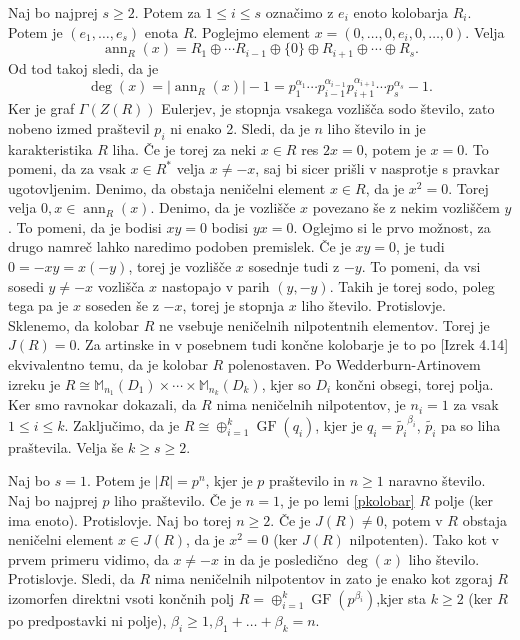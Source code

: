 \documentclass[a4paper, 12pt]{amsart}
\theoremstyle{definition} %
\theoremstyle{plain} %
\newcommand{\M}{\mathbb M}
\DeclareMathOperator{\ann}{ann}
\DeclareMathOperator{\GF}{GF}
\begin{document}
Naj bo najprej $s\ge 2$. Potem za $1 \le i \le s$ označimo z $e_i$ enoto kolobarja $R_i$. Potem je $(e_1, \dots, e_s)$ enota $R$. Poglejmo  element $x = (0,\dots, 0,e_i,0,\dots,0)$. Velja
$$
\ann_R(x) = R_1\oplus  \cdots R_{i-1} \oplus \{ 0 \} \oplus R_{i+1} \oplus \cdots \oplus R_{s}.
$$  
Od tod takoj sledi, da je
$$
\deg(x) = |\ann_R(x)| - 1 = p_1^{\alpha_1} \cdots p_{i-1}^{\alpha_{i-1}} p_{i+1}^{\alpha_{i+1}} \cdots p_s^{\alpha_s} - 1.
$$
Ker je graf $\Gamma(Z(R))$ Eulerjev, je stopnja vsakega vozlišča sodo število, zato nobeno izmed praštevil $p_i$ ni enako 2. Sledi, da je $n$ liho število in je karakteristika $R$ liha. Če je torej za neki $x\in R$ res $2x = 0$, potem je $x=0$. To pomeni, da za vsak $x\in R^*$ velja $x\neq -x$, saj bi sicer prišli v nasprotje s pravkar ugotovljenim. Denimo, da obstaja neničelni element $x\in R$, da je $x^2 = 0$. Torej velja $0,x\in \ann_R(x)$. Denimo, da je vozlišče $x$ povezano še z nekim vozliščem $y$. To pomeni, da je bodisi $xy=0$ bodisi $yx=0$. Oglejmo si le prvo možnost, za drugo namreč lahko naredimo podoben premislek. Če je $xy = 0$, je tudi $0=-xy=x(-y)$, torej je vozlišče $x$ sosednje tudi z $-y$. To pomeni, da vsi sosedi $y\neq -x$ vozlišča $x$ nastopajo v parih $(y,-y)$. Takih je torej sodo, poleg tega pa je $x$ soseden še z $-x$, torej je stopnja $x$ liho število. Protislovje. Sklenemo, da kolobar $R$ ne vsebuje neničelnih nilpotentnih elementov. Torej je $J(R)=0$. Za artinske in v posebnem tudi končne kolobarje je to po \cite{Lam}[Izrek 4.14] ekvivalentno temu, da je kolobar $R$ polenostaven. Po Wedderburn-Artinovem izreku je  $R\cong \M_{n_1}(D_1)\times \cdots \times \M_{n_k}(D_k)$, kjer so $D_i$ končni obsegi, torej polja. Ker  smo ravnokar dokazali, da $R$ nima neničelnih nilpotentov, je $n_i= 1$ za vsak $1\le i \le k$. Zaključimo, da je $R\cong \oplus_{i=1}^k \GF(q_i)$, kjer je $q_i = \tilde{p_i}^{\beta_i}$, $\tilde{p_i}$ pa so liha praštevila. Velja še $k\ge s \ge 2$.

Naj bo $s=1$. Potem je $|R| = p^n$, kjer je $p$ praštevilo in $n\ge1$ naravno število. Naj bo najprej $p$ liho praštevilo. Če je $n=1$, je po lemi \ref{pkolobar} $R$ polje (ker ima enoto). Protislovje. Naj bo torej $n\ge 2$. Če je $J(R) \neq 0$, potem v $R$ obstaja neničelni element $x\in J(R)$, da je $x^2 = 0$ (ker $J(R)$ nilpotenten). Tako kot v prvem primeru vidimo, da $x\neq -x$ in da je posledično $\deg(x)$ liho število. Protislovje. Sledi, da $R$ nima neničelnih nilpotentov in  zato je enako kot zgoraj $R$ izomorfen direktni vsoti končnih polj $R=\oplus_{i=1}^k \GF(p^{\beta_i})$,kjer sta  $k\ge 2$ (ker $R$ po predpostavki ni polje), $\beta_i \ge 1, \beta_1 + \dots + \beta_k = n$.
\end{document}
